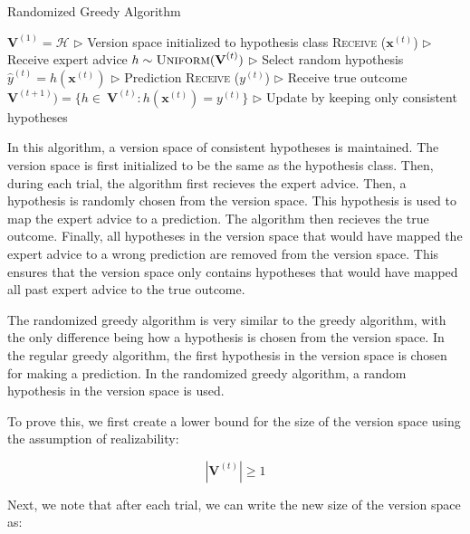 \documentclass[11pt]{article}
\begin{document}
\begin{algorithm}[H]
\caption{Randomized Greedy Algorithm}
\label{algo:randomgreedy}
\begin{algorithmic}[1]
\STATE $\textbf{V}^{(1)} = \mathcal{H}$ \hfill $\triangleright$ Version space initialized to hypothesis class
\STATE \textsc{Receive} ($\textbf{x}^{(t)}$) \hfill $\triangleright$ Receive expert advice
\STATE $h \sim \textsc{Uniform}(\textbf{V}^{(t)})$ \hfill $\triangleright$ Select random hypothesis
\STATE $\hat{y}^{(t)} = h(\textbf{x}^{(t)})$ \hfill $\triangleright$ Prediction
\STATE \textsc{Receive} ($y^{(t)}$) \hfill $\triangleright$ Receive true outcome
\STATE $\textbf{V}^{(t+1)}) = \{h \in\ \textbf{V}^{(t)} : h(\textbf{x}^{(t)}) = y^{(t)}\}$ \hfill $\triangleright$ Update by keeping only consistent hypotheses
\ENDFOR
\end{algorithmic}
\end{algorithm}

In this algorithm, a version space of consistent hypotheses is maintained. The version space is first initialized to be the same as the hypothesis class. Then, during each trial, the algorithm first recieves the expert advice. Then, a hypothesis is randomly chosen from the version space. This hypothesis is used to map the expert advice to a prediction. The algorithm then recieves the true outcome. Finally, all hypotheses in the version space that would have mapped the expert advice to a wrong prediction are removed from the version space. This ensures that the version space only contains hypotheses that would have mapped all past expert advice to the true outcome. 

The randomized greedy algorithm is very similar to the greedy algorithm, with the only difference being how a hypothesis is chosen from the version space. In the regular greedy algorithm, the first hypothesis in the version space is chosen for making a prediction. In the randomized greedy algorithm, a random hypothesis in the version space is used. 


\normalfont
To prove this, we first create a lower bound for the size of the version space using the assumption of realizability:

$$|\textbf{V}^{(t)}| \geq 1$$

Next, we note that after each trial, we can write the new size of the version space as:
\end{document}
